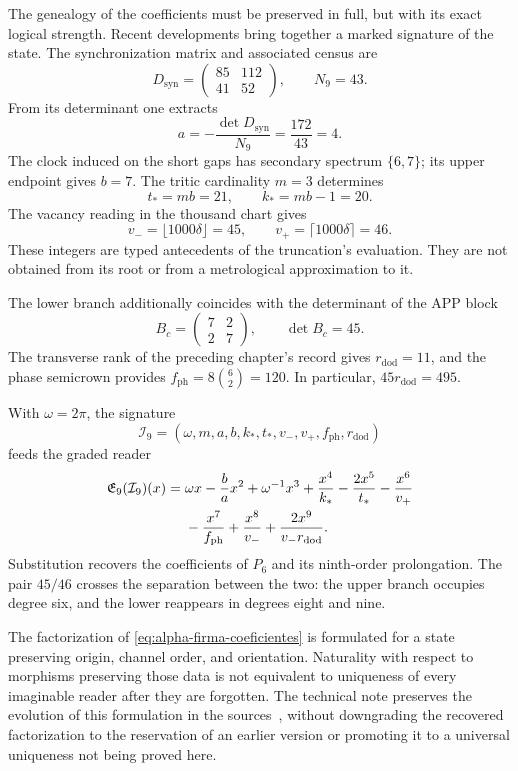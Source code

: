 The genealogy of the coefficients must be preserved in full, but with its
exact logical strength. Recent developments bring together a marked signature
of the state. The synchronization matrix and associated census are
\[
 D_{\mathrm{syn}}=\begin{pmatrix}85&112\\41&52\end{pmatrix},
 \qquad N_9=43.
\]
From its determinant one extracts
\[
 a=-\frac{\det D_{\mathrm{syn}}}{N_9}
   =\frac{172}{43}=4.
\]
The clock induced on the short gaps has secondary spectrum
\(\{6,7\}\); its upper endpoint gives \(b=7\). The tritic cardinality
\(m=3\) determines
\[
 t_*=mb=21,\qquad k_*=mb-1=20.
\]
The vacancy reading in the thousand chart gives
\[
 v_-=\lfloor1000\delta\rfloor=45,\qquad
 v_+=\lceil1000\delta\rceil=46.
\]
These integers are typed antecedents of the truncation's evaluation. They are not
obtained from its root or from a metrological approximation to it.

The lower branch additionally coincides with the determinant of the APP block
\[
 B_c=\begin{pmatrix}7&2\\2&7\end{pmatrix},\qquad\det B_c=45.
\]
The transverse rank of the preceding chapter's record gives
\(r_{\mathrm{dod}}=11\), and the phase semicrown provides
\(f_{\mathrm{ph}}=8\binom62=120\). In particular,
\(45r_{\mathrm{dod}}=495\).

With \(\omega=2\pi\), the signature
\[
 \mathcal I_9=(\omega,m,a,b,k_*,t_*,v_-,v_+,f_{\mathrm{ph}},r_{\mathrm{dod}})
\]
feeds the graded reader
\begin{align}
 \mathfrak E_9(\mathcal I_9)(x)
 ={}&\omega x-\frac ba x^2+\omega^{-1}x^3
 +\frac{x^4}{k_*}-\frac{2x^5}{t_*}-\frac{x^6}{v_+}\notag\\
 &-\frac{x^7}{f_{\mathrm{ph}}}+\frac{x^8}{v_-}
 +\frac{2x^9}{v_-r_{\mathrm{dod}}}.
 \label{eq:alpha-firma-coeficientes}
\end{align}
Substitution recovers the coefficients of \(P_6\) and its
ninth-order prolongation. The pair \(45/46\) crosses the separation
between the two: the upper branch occupies degree six, and the lower reappears
in degrees eight and nine.

The factorization of \eqref{eq:alpha-firma-coeficientes} is formulated
for a state preserving origin, channel order, and orientation.
Naturality with respect to morphisms preserving those data is not equivalent to
uniqueness of every imaginable reader after they are forgotten. The technical
note preserves the evolution of this formulation in the sources~\cite{hmtholonomia},
without downgrading the recovered factorization to the reservation of an earlier
version or promoting it to a universal uniqueness not being
proved here.

